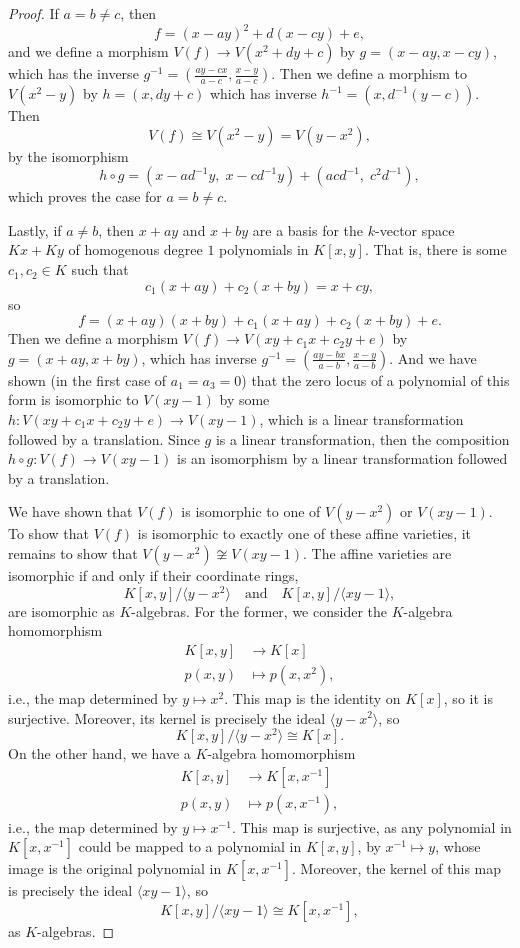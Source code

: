 \documentclass[12pt]{article}
\theoremstyle{definition}
\newcommand{\isp}[1]{\quad\text{#1}\quad}
\newcommand{\<}{\langle}
\renewcommand{\>}{\rangle}
\newcommand{\isom}{\cong}
\begin{document}
\begin{proof}
    If $a = b \ne c$, then
    \[
        f = (x - ay)^2 + d(x - cy) + e,
    \]
    and we define a morphism $V(f) \to V(x^2 + dy + c)$ by $g = (x - ay, x - cy)$, which has the inverse $g^{-1} = \left(\frac{ay - cx}{a - c}, \frac{x - y}{a - c}\right)$. Then we define a morphism to $V(x^2 - y)$ by $h = (x, dy + c)$ which has inverse $h^{-1} = (x, d^{-1}(y - c))$. Then 
    \[
        V(f) \isom V(x^2 - y) = V(y - x^2),
    \]
    by the isomorphism
    \[
        h \circ g = (x - ad^{-1}y,\; x - cd^{-1}y) + (acd^{-1},\; c^2d^{-1}),
    \]
    which proves the case for $a = b \ne c$.

    Lastly, if $a \ne b$, then $x + ay$ and $x + by$ are a basis for the $k$-vector space $Kx + Ky$ of homogenous degree $1$ polynomials in $K[x, y]$. That is, there is some $c_1, c_2 \in K$ such that
    \[
        c_1(x + ay) + c_2(x + by) = x + cy,
    \]
    so
    \[
        f = (x + ay)(x + by) + c_1(x + ay) + c_2(x + by) + e.
    \]
    Then we define a morphism $V(f) \to V(xy + c_1x + c_2y + e)$ by $g = (x + ay, x + by)$, which has inverse $g^{-1} = \left(\frac{ay - bx}{a - b}, \frac{x - y}{a - b}\right)$. And we have shown (in the first case of $a_1 = a_3 = 0$) that the zero locus of a polynomial of this form is isomorphic to $V(xy - 1)$ by some $h : V(xy + c_1x + c_2y + e) \to V(xy - 1)$, which is a linear transformation followed by a translation. Since $g$ is a linear transformation, then the composition $h \circ g : V(f) \to V(xy - 1)$ is an isomorphism by a linear transformation followed by a translation.

    We have shown that $V(f)$ is isomorphic to one of $V(y - x^2)$ or $V(xy - 1)$. To show that $V(f)$ is isomorphic to exactly one of these affine varieties, it remains to show that $V(y - x^2) \not\isom V(xy - 1)$. The affine varieties are isomorphic if and only if their coordinate rings,
    \[
        K[x, y]/\<y - x^2\> \isp{and} K[x, y]/\<xy - 1\>,
    \]
    are isomorphic as $K$-algebras. For the former, we consider the $K$-algebra homomorphism
    \begin{align*}
        K[x, y] &\to K[x] \\
            p(x, y) &\mapsto p(x, x^2),
    \end{align*}
    i.e., the map determined by $y \mapsto x^2$. This map is the identity on $K[x]$, so it is surjective. Moreover, its kernel is precisely the ideal $\<y - x^2\>$, so
    \[
        K[x, y]/\<y - x^2\> \isom K[x].
    \]
    On the other hand, we have a $K$-algebra homomorphism
    \begin{align*}
        K[x, y] &\to K[x, x^{-1}] \\
            p(x, y) &\mapsto p(x, x^{-1}),
    \end{align*}
    i.e., the map determined by $y \mapsto x^{-1}$. This map is surjective, as any polynomial in $K[x, x^{-1}]$ could be mapped to a polynomial in $K[x, y]$, by $x^{-1} \mapsto y$, whose image is the original polynomial in $K[x, x^{-1}]$. Moreover, the kernel of this map is precisely the ideal $\<xy - 1\>$, so
    \[
        K[x, y]/\<xy - 1\> \isom K[x, x^{-1}],
    \]
    as $K$-algebras.


\end{proof}
\end{document}
